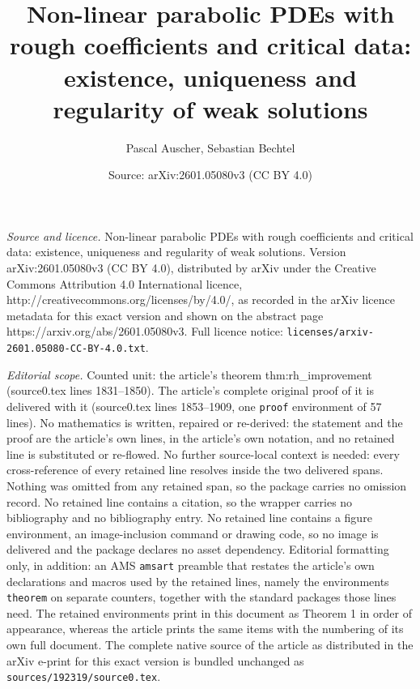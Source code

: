 \documentclass[10pt,a4paper]{amsart}
\title{Non-linear parabolic PDEs with rough coefficients and critical data: existence, uniqueness and regularity of weak solutions}
\author{Pascal Auscher, Sebastian Bechtel}
\date{Source: arXiv:2601.05080v3 (CC BY 4.0)}
\begin{document}
\maketitle

\noindent\emph{Source and licence.} Non-linear parabolic PDEs with rough coefficients and critical data: existence, uniqueness and regularity of weak solutions. Version arXiv:2601.05080v3 (CC BY 4.0), distributed by arXiv under the Creative Commons Attribution 4.0 International licence, http://creativecommons.org/licenses/by/4.0/, as recorded in the arXiv licence metadata for this exact version and shown on the abstract page https://arxiv.org/abs/2601.05080v3. Full licence notice: \texttt{licenses/arxiv-2601.05080-CC-BY-4.0.txt}.\par\smallskip

\noindent\textit{Editorial scope.} Counted unit: the article's theorem thm:rh\_improvement (source0.tex lines 1831--1850). The article's complete original proof of it is delivered with it (source0.tex lines 1853--1909, one \texttt{proof} environment of 57 lines). No mathematics is written, repaired or re-derived: the statement and the proof are the article's own lines, in the article's own notation, and no retained line is substituted or re-flowed.  No further source-local context is needed: every cross-reference of every retained line resolves inside the two delivered spans.  Nothing was omitted from any retained span, so the package carries no omission record.  No retained line contains a citation, so the wrapper carries no bibliography and no bibliography entry.  No retained line contains a figure environment, an image-inclusion command or drawing code, so no image is delivered and the package declares no asset dependency.  Editorial formatting only, in addition: an AMS \texttt{amsart} preamble that restates the article's own declarations and macros used by the retained lines, namely the environments \texttt{theorem} on separate counters, together with the standard packages those lines need.  The retained environments print in this document as Theorem 1 in order of appearance, whereas the article prints the same items with the numbering of its own full document.  The complete native source of the article as distributed in the arXiv e-print for this exact version is bundled unchanged as \texttt{sources/192319/source0.tex}.
\end{document}
